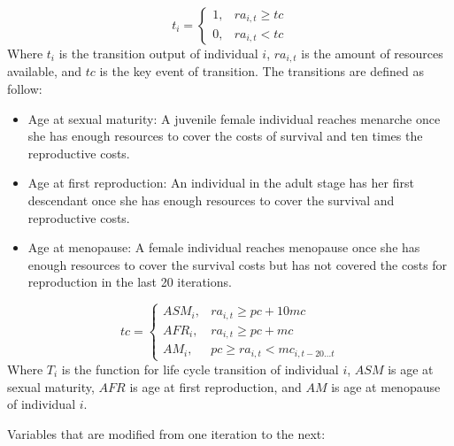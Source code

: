 \documentclass{article}
\begin{document}
\begin{itemize}
\begin{equation}
    t_i=\begin{cases}
    1,& ra_{i,t} \geq tc\\
    0,& ra_{i,t} < tc
\end{cases}
\end{equation}
        Where $t_i$ is the transition output of individual $i$, $ra_{i,t}$ is the amount of resources available, and $tc$ is the key event of transition. The transitions are defined as follow:
        \begin{itemize}
            \item Age at sexual maturity: A juvenile female individual reaches menarche once she has enough resources to cover the costs of survival and ten times the reproductive costs.
            \item Age at first reproduction: An individual in the adult stage has her first descendant once she has enough resources to cover the survival and reproductive costs.
            \item Age at menopause: A female individual reaches menopause once she has enough resources to cover the survival costs but has not covered the costs for reproduction in the last 20 iterations. 
        \end{itemize}
\begin{equation}
    tc=\begin{cases}
    ASM_i,& ra_{i,t} \geq pc+10mc\\
    AFR_i,& ra_{i,t} \geq pc+mc\\
    AM_i,& pc \geq ra_{i,t} < mc_{i,t-20...t}
\end{cases}
\end{equation}
        Where $T_i$ is the function for life cycle transition of individual $i$, $ASM$ is age at sexual maturity, $AFR$ is age at first reproduction, and $AM$ is age at menopause of individual $i$.
    \end{itemize}
Variables that are modified from one iteration to the next:
\end{document}
